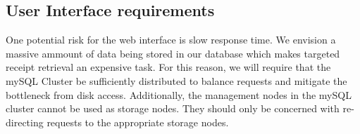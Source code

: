 \subsection{User Interface requirements}
\label{sec:requirements.interface}

One potential risk for the web interface is slow response time.  We envision a massive ammount of data being stored in our database which makes targeted receipt retrieval an expensive task.  For this reason, we will require that the mySQL Cluster be sufficiently distributed to balance requests and mitigate the bottleneck from disk access.  Additionally, the management nodes in the mySQL cluster cannot be used as storage nodes.  They should only be concerned with re-directing requests to the appropriate storage nodes.

